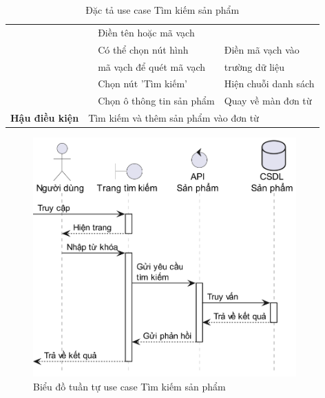 \documentclass[../DoAn.tex]{subfiles}
\begin{document}
\begin{table}[H]
\begin{tabular}{|l|c|l|l|}
                                                &                                                                    & Điền tên hoặc mã vạch                   &                                                 \\
                                                &                                                                    & Có thể chọn nút hình                    & Điền mã vạch vào                                \\
                                                &                                                                    & mã vạch để quét mã vạch                 & trường dữ liệu                                  \\ \cline{3-4}
                                                &                                                                    & Chọn nút 'Tìm kiếm'                     & Hiện chuỗi danh sách                            \\ \cline{3-4}
                                                &                                                                    & Chọn ô thông tin sản phẩm               & Quay về màn đơn từ                              \\ \hline
        \textbf{Hậu điều kiện}                  & \multicolumn{3}{l|}{Tìm kiếm và thêm sản phẩm vào đơn từ}                                                                                                      \\ \hline
    \end{tabular}
    \caption{Đặc tả use case Tìm kiếm sản phẩm}
    \label{table:uc-product-search}
\end{table}
\break

\begin{figure}[H]
    \centering
    \includegraphics[width=0.9\textwidth]{Hinhve/sequences/ProductSearch.png}
    \caption{Biểu đồ tuần tự use case Tìm kiếm sản phẩm}
    \label{figure:sd-product-search}
\end{figure}
\end{document}

